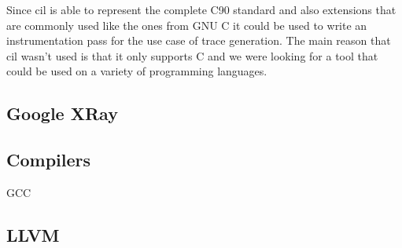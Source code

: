 Since \gls{cil} is able to represent the complete C90 standard and also extensions that are commonly used like the ones from GNU C it could be used to write an instrumentation pass for the use case of trace generation.
The main reason that \gls{cil} wasn't used is that it only supports C and we were looking for a tool that could be used on a variety of programming languages.


\subsection{Google XRay}
\subsection{Compilers}
GCC
\subsection{LLVM}
\label{sec:related:traces:llvm}

